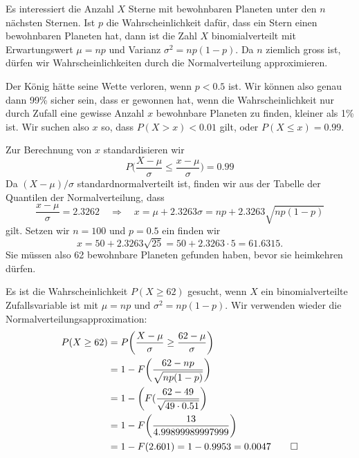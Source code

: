 \begin{loesung}
\begin{teilaufgaben}
\item
Es interessiert die Anzahl $X$ Sterne mit bewohnbaren Planeten
unter den $n$ nächsten Sternen.
Ist $p$ die  Wahrscheinlichkeit dafür, dass ein Stern einen bewohnbaren
Planeten hat, dann ist die Zahl $X$ binomialverteilt mit Erwartungswert
$\mu=np$ und Varianz $\sigma^2=np(1-p)$. Da $n$ ziemlich gross ist, dürfen wir
Wahrscheinlichkeiten durch die Normalverteilung approximieren.

Der König hätte seine Wette verloren, wenn $p<0.5$ ist. Wir können
also genau dann 99\% sicher sein, dass er gewonnen hat, wenn
die Wahrscheinlichkeit nur durch Zufall eine gewisse Anzahl $x$
bewohnbare Planeten zu finden, kleiner als 1\% ist.
Wir suchen also $x$ so, dass $P(X>x)<0.01$ gilt, oder $P(X\le x)=0.99$.

Zur Berechnung von $x$ standardisieren wir
\[
P\biggl(
\frac{X-\mu}{\sigma}\le \frac{x-\mu}{\sigma}
\biggr)
=0.99
\]
Da $(X-\mu)/\sigma$ standardnormalverteilt ist, finden wir aus
der Tabelle der Quantilen der Normalverteilung, dass
\[
\frac{x-\mu}{\sigma}=2.3262
\quad\Rightarrow\quad
x=\mu+2.3263\sigma=np+2.3263\sqrt{np(1-p)}
\]
gilt. Setzen wir $n=100$ und $p=0.5$ ein finden wir
\[
x=50 + 2.3263\sqrt{25}=50 + 2.3263\cdot 5=61.6315.
\]
Sie müssen also 62 bewohnbare Planeten gefunden haben, bevor sie heimkehren
dürfen.

\item Es ist die Wahrscheinlichkeit
$P(X\ge 62)$ gesucht, wenn $X$ ein binomialverteilte Zufallsvariable
ist mit $\mu=np$ und $\sigma^2=np(1-p)$. Wir verwenden wieder die
Normalverteilungsapproximation:
\begin{align*}
P(X\ge 62)
&=
P\biggl(
\frac{X-\mu}{\sigma}\ge \frac{62-\mu}{\sigma}
\biggr)\\
&
=1-F\biggl(
\frac{62-np}{\sqrt{np(1-p)}}
\biggr)
\\
&
=1-\biggl(F(\frac{62-49}{\sqrt{49\cdot 0.51}}\biggr)
\\
&
=
1-F\biggl(\frac{13}{4.99899989997999}\biggr)
\\
&=1-F(2.601)=1-0.9953=0.0047
\qedhere
\end{align*}
\end{teilaufgaben}
\end{loesung}
